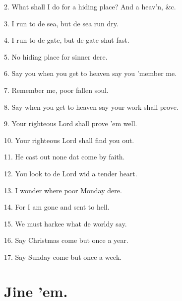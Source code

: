 \documentclass[a5paper,10pt]{book}
\begin{document}
\begin{song}
\end{song}

\begin{stanza}
\setlength{\itemsep}{1pt}
\item[2.]
  What shall I do for a hiding place?  And a heav'n, \&c.

\item[3.]
  I run to de sea, but de sea run dry.

\item[4.]
  I run to de gate, but de gate shut fast.

\item[5.]
  No hiding place for sinner dere.

\item[6.]
  Say you when you get to heaven say you 'member me.

\item[7.]
  Remember me, poor fallen soul.

\item[8.]
  Say when you get to heaven say your work shall prove.

\item[9.]
  Your righteous Lord shall prove 'em well.

\item[10.]
  Your righteous Lord shall find you out.

\item[11.]
  He cast out none dat come by faith.

\item[12.]
  You look to de Lord wid a tender heart.

\item[13.]
 I wonder where poor Monday dere.

\item[14.]
  For I am gone and sent to hell.

\item[15.]
  We must harkee what de worldy say.

\item[16.]
  Say Christmas come but once a year.

\item[17.]
  Say Sunday come but once a week.
\end{stanza}


\newpage
\section{Jine 'em.}
\thispagestyle{empty}
\end{document}
